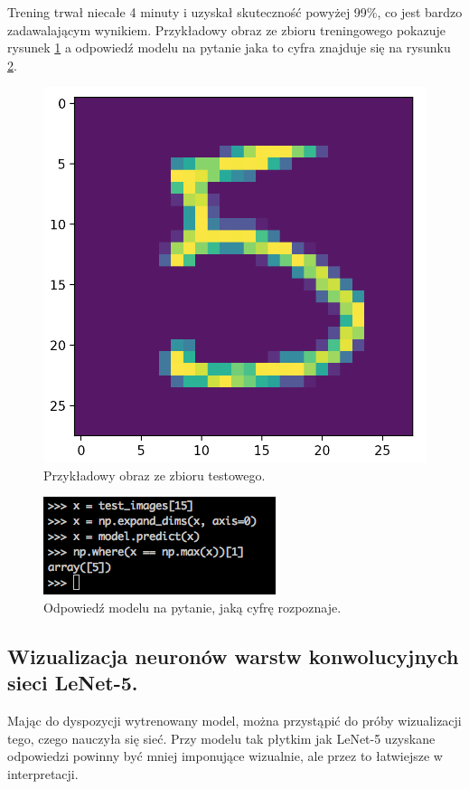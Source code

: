 Trening trwał niecałe 4 minuty i uzyskał skuteczność powyżej 99\%, co jest bardzo zadawalającym wynikiem. Przykładowy obraz ze zbioru treningowego pokazuje rysunek \ref{fig:lenet5-digit} a odpowiedź modelu na pytanie jaka to cyfra znajduje się na rysunku \ref{fig:lenet5-response}.

\begin{figure}[ht]
\centerline{\includegraphics[scale=0.5]{resources/example_digit_lenet5.png}}
\caption{Przykładowy obraz ze zbioru testowego.}
\label{fig:lenet5-digit}
\end{figure}

\begin{figure}[ht]
\centerline{\includegraphics[scale=0.5]{resources/example_digit_lenet5_response.png}}
\caption{Odpowiedź modelu na pytanie, jaką cyfrę rozpoznaje.}
\label{fig:lenet5-response}
\end{figure}

\label{lenet-wiz}
\subsection{Wizualizacja neuronów warstw konwolucyjnych sieci LeNet-5.}
Mając do dyspozycji wytrenowany model, można przystąpić do próby wizualizacji tego, czego nauczyła się sieć. Przy modelu tak płytkim jak LeNet-5 uzyskane odpowiedzi powinny być mniej imponujące wizualnie, ale przez to łatwiejsze w interpretacji.

